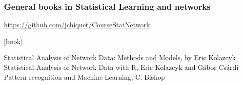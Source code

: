\documentclass{beamer}\usepackage[]{graphicx}\usepackage[]{color}
\begin{document}
  \begin{frame}
    \frametitle{General books in Statistical Learning and networks}

    \url{https://github.com/jchiquet/CourseStatNetwork} 

    \vfill
    
    \begin{thebibliography}{99}
      [book]

     Statistical Analysis of Network Data: Methods and Models, by \textcolor{black}{Eric Kolazcyk}
     Statistical Analysis of Network Data with R, \textcolor{black}{Eric Kolazcyk and Gábor Csárdi}
     Pattern recognition and Machine Learning, \textcolor{black}{C. Bishop}
    
    \end{thebibliography}

  \end{frame}

\end{document}

